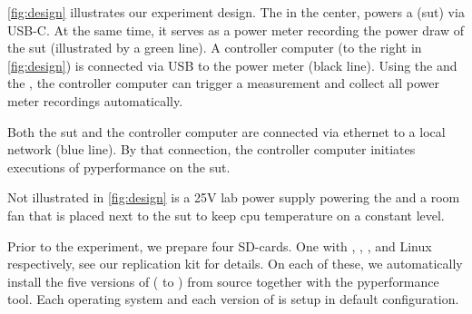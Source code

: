 \autoref{fig:design} illustrates our experiment design.
The  in the center, powers a  (\gls{sut}) via USB-C.
At the same time, it serves as a power meter recording the power draw of the \gls{sut} (illustrated by a green line).
A controller computer (to the right in \autoref{fig:design}) is connected via USB to the power meter (black line).
Using the 
and the 
, the controller computer can trigger a measurement and collect all power meter recordings automatically.

Both the \gls{sut} and the controller computer are connected via ethernet to a local network (blue line).
By that connection, the controller computer initiates executions of \acrlong{pyperformance} on the \gls{sut}.

Not illustrated in \autoref{fig:design} is a 25V lab power supply powering the  and a room fan that is placed next to the \gls{sut} to keep \gls{cpu} temperature on a constant level.

Prior to the experiment, we prepare four SD-cards.
One with , , , and  Linux respectively, see our replication kit for details.
On each of these, we automatically install the five versions of \python ( to ) from source together with the \gls{pyperformance} tool.
Each operating system and each version of \python is setup in default configuration.





